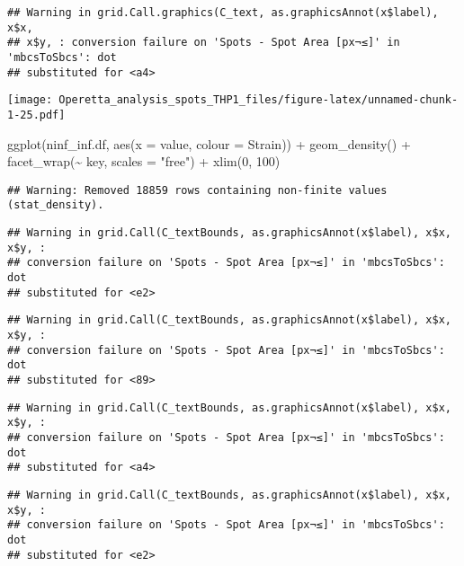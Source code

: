 \documentclass[
]{article}
\newenvironment{Shaded}{\begin{snugshade}}{\end{snugshade}}
\newcommand{\AttributeTok}[1]{\textcolor[rgb]{0.77,0.63,0.00}{#1}}
\newcommand{\DecValTok}[1]{\textcolor[rgb]{0.00,0.00,0.81}{#1}}
\newcommand{\FunctionTok}[1]{\textcolor[rgb]{0.00,0.00,0.00}{#1}}
\newcommand{\NormalTok}[1]{#1}
\newcommand{\SpecialCharTok}[1]{\textcolor[rgb]{0.00,0.00,0.00}{#1}}
\newcommand{\StringTok}[1]{\textcolor[rgb]{0.31,0.60,0.02}{#1}}
\begin{document}
\begin{verbatim}
## Warning in grid.Call.graphics(C_text, as.graphicsAnnot(x$label), x$x,
## x$y, : conversion failure on 'Spots - Spot Area [px¬≤]' in 'mbcsToSbcs': dot
## substituted for <a4>
\end{verbatim}

\texttt{[image: Operetta\_analysis\_spots\_THP1\_files/figure-latex/unnamed-chunk-1-25.pdf]}

\begin{Shaded}
\begin{Highlighting}[]
\FunctionTok{ggplot}\NormalTok{(ninf\_inf.df, }\FunctionTok{aes}\NormalTok{(}\AttributeTok{x =}\NormalTok{ value, }\AttributeTok{colour =}\NormalTok{ Strain)) }\SpecialCharTok{+}
  \FunctionTok{geom\_density}\NormalTok{() }\SpecialCharTok{+}
  \FunctionTok{facet\_wrap}\NormalTok{(}\SpecialCharTok{\textasciitilde{}}\NormalTok{ key, }\AttributeTok{scales =} \StringTok{"free"}\NormalTok{) }\SpecialCharTok{+}
  \FunctionTok{xlim}\NormalTok{(}\DecValTok{0}\NormalTok{, }\DecValTok{100}\NormalTok{)}
\end{Highlighting}
\end{Shaded}

\begin{verbatim}
## Warning: Removed 18859 rows containing non-finite values (stat_density).
\end{verbatim}

\begin{verbatim}
## Warning in grid.Call(C_textBounds, as.graphicsAnnot(x$label), x$x, x$y, :
## conversion failure on 'Spots - Spot Area [px¬≤]' in 'mbcsToSbcs': dot
## substituted for <e2>
\end{verbatim}

\begin{verbatim}
## Warning in grid.Call(C_textBounds, as.graphicsAnnot(x$label), x$x, x$y, :
## conversion failure on 'Spots - Spot Area [px¬≤]' in 'mbcsToSbcs': dot
## substituted for <89>
\end{verbatim}

\begin{verbatim}
## Warning in grid.Call(C_textBounds, as.graphicsAnnot(x$label), x$x, x$y, :
## conversion failure on 'Spots - Spot Area [px¬≤]' in 'mbcsToSbcs': dot
## substituted for <a4>
\end{verbatim}

\begin{verbatim}
## Warning in grid.Call(C_textBounds, as.graphicsAnnot(x$label), x$x, x$y, :
## conversion failure on 'Spots - Spot Area [px¬≤]' in 'mbcsToSbcs': dot
## substituted for <e2>
\end{verbatim}
\end{document}
